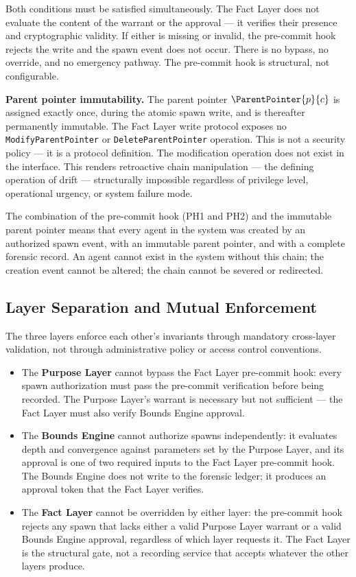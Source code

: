 Both conditions must be satisfied simultaneously. The Fact Layer does not evaluate the content of the warrant or the approval --- it verifies their presence and cryptographic validity. If either is missing or invalid, the pre-commit hook rejects the write and the spawn event does not occur. There is no bypass, no override, and no emergency pathway. The pre-commit hook is structural, not configurable.

\medskip
\noindent\textbf{Parent pointer immutability.} The parent pointer $\ParentPointer{p}{c}$ is assigned exactly once, during the atomic spawn write, and is thereafter permanently immutable. The Fact Layer write protocol exposes no \texttt{ModifyParentPointer} or \texttt{DeleteParentPointer} operation. This is not a security policy --- it is a protocol definition. The modification operation does not exist in the interface. This renders retroactive chain manipulation --- the defining operation of drift --- structurally impossible regardless of privilege level, operational urgency, or system failure mode.

The combination of the pre-commit hook (PH1 and PH2) and the immutable parent pointer means that every agent in the system was created by an authorized spawn event, with an immutable parent pointer, and with a complete forensic record. An agent cannot exist in the system without this chain; the creation event cannot be altered; the chain cannot be severed or redirected.

\subsection{Layer Separation and Mutual Enforcement}
\label{sec:layer_separation}

The three layers enforce each other's invariants through mandatory cross-layer validation, not through administrative policy or access control conventions.

\begin{itemize}
\item The \textbf{Purpose Layer} cannot bypass the Fact Layer pre-commit hook: every spawn authorization must pass the pre-commit verification before being recorded. The Purpose Layer's warrant is necessary but not sufficient --- the Fact Layer must also verify Bounds Engine approval.
\item The \textbf{Bounds Engine} cannot authorize spawns independently: it evaluates depth and convergence against parameters set by the Purpose Layer, and its approval is one of two required inputs to the Fact Layer pre-commit hook. The Bounds Engine does not write to the forensic ledger; it produces an approval token that the Fact Layer verifies.
\item The \textbf{Fact Layer} cannot be overridden by either layer: the pre-commit hook rejects any spawn that lacks either a valid Purpose Layer warrant or a valid Bounds Engine approval, regardless of which layer requests it. The Fact Layer is the structural gate, not a recording service that accepts whatever the other layers produce.
\end{itemize}

